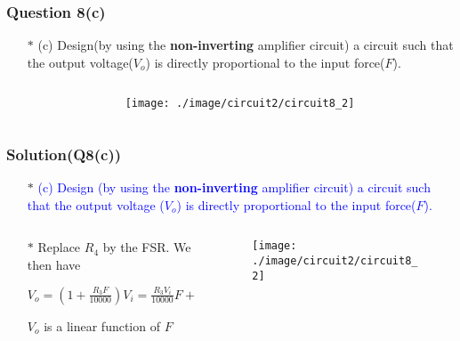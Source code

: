 \documentclass{beamer}
\newcommand{\blue}[1]{\textcolor{blue}{#1}}
\begin{document}
\begin{frame}
\frametitle{Question 8(c)}
\begin{itemize} \itemsep1pt \parskip0pt 
  \item[$\ast$] (c) Design(by using the {\bf non-inverting} amplifier circuit) a circuit such that the output voltage($V_o$) is directly proportional to the input force($F$).
\end{itemize}

\begin{columns}

\begin{column}{6cm}

\end{column}


\begin{column}{6cm}
\begin{figure}[H]
  \centering
  \texttt{[image: ./image/circuit2/circuit8\_2]}
\end{figure}
\end{column}

\end{columns}

\end{frame}


\begin{frame}
\frametitle{Solution(Q8(c))}
\begin{itemize} \itemsep1pt \parskip0pt 
  \item[$\ast$] \blue{(c) Design (by using the {\bf non-inverting} amplifier circuit) a circuit such that the output voltage ($V_o$) is directly proportional to the input force($F$).}
\end{itemize}


\begin{columns}

\begin{column}{8cm}
\begin{itemize} \itemsep1pt \parskip0pt 
  \item[$\ast$] Replace $R_4$ by the FSR. We then have
  \item[] $V_o = (1 + \frac{R_3F}{10000})V_i = \frac{R_3V_i}{10000}F + V_i$
  \item[] $V_o$ is a linear function of $F$
\end{itemize}
\end{column}


\begin{column}{4cm}
\begin{figure}[H]
  \centering
  \texttt{[image: ./image/circuit2/circuit8\_2]}
\end{figure}
\end{column}

\end{columns}



\end{frame}
\end{document}
